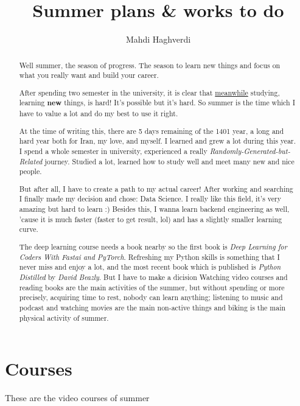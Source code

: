 \documentclass[12pt]{article}
\title{Summer plans \& works to do}
\author{Mahdi Haghverdi}
\date{}
\begin{document}
	\maketitle
	\tableofcontents
	\newpage
	
	\begin{abstract}
		Well summer, the season of progress. The season to learn new things and focus on what you really want and build your career.

		After spending two semester in the university, it is clear that \underline{meanwhile} studying, learning \textbf{new}  things, is hard! It's possible but it's hard. So summer is the time which I have to value a lot and do my best to use it right.
		
		At the time of writing this, there are 5 days remaining of the 1401 year, a long and hard year both for Iran, my love, and myself. I learned and grew a lot during this year. I spend a whole semester in university, experienced a really \textit{Randomly-Generated-but-Related} journey. Studied a lot, learned how to study well and meet many new and nice people.
		
		But after all, I have to create a path to my actual career! After working and searching I finally made my decision and chose: Data Science. I really like this field, it's very amazing but hard to learn :) Besides this, I wanna learn backend engineering as well, 'cause it is much faster (faster to get result, lol) and has a slightly smaller learning curve.
		
		The deep learning course needs a book nearby so the first book is \textit{Deep Learning for Coders With Fastai and PyTorch}.
		Refreshing my Python skills is something that I never miss and enjoy a lot, and the most recent book which is published is \textit{Python Distilled} by \textit{David Beazly}. But I have to make a dicision
		Watching video courses and reading books are the main activities of the summer, but without spending or more precisely, acquiring time to rest, nobody can learn anything; listening to music and podcast and watching movies are the main non-active things and biking is the main physical activity of summer.
				
	\end{abstract}

	\section{Courses}
		These are the video courses of summer
		
\end{document}
